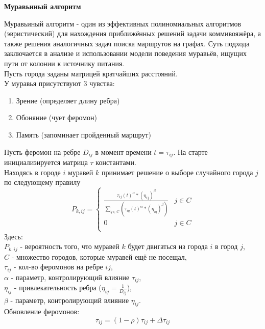 \documentclass[a4paper,12pt]{article}
\begin{document}
\begin{center}
\textbf{Муравьиный алгоритм}
\end{center}
Муравьиный алгоритм - один из эффективных полиномиальных алгоритмов (эвристический) для нахождения приближённых решений задачи коммивояжёра, а также решения аналогичных задач поиска маршрутов на графах. Суть подхода заключается в анализе и использовании модели поведения муравьёв, ищущих пути от колонии к источнику питания.\\
Пусть города заданы матрицей кратчайших расстояний.\\
У муравья присутствуют 3 чувства:
\begin{enumerate}
\item Зрение (определяет длину ребра)
\item Обоняние (чует феромон)
\item Память (запоминает пройденный маршрут)
\end{enumerate}
Пусть феромон на ребре $D_{ij}$ в момент времени $t = \tau_{ij}$. На старте инициализируется матрица $\tau$ константами.\\
Находясь в городе $i$ муравей $k$  принимает решение о выборе случайного города $j$ по следующему правилу\cite{Shtobva}\\
\begin{equation}\label{equations:equation1}
P_{k,ij} = \left\{
\begin{array}{ll}
\frac{\tau_{ij}(t)^\alpha * (\eta_{ij})^\beta}{\sum_{q \in C}(\tau_{iq}(t)^\alpha * (\eta_{iq})^\beta)} & j \in C \\
0 & j \in C \\
\end{array}
\right.
\end{equation}
Здесь:\\
$P_{k,ij}$ - вероятность того, что муравей $k$ будет двигаться из города $i$ в город $j$,\\
$C$ - множество городов, которые муравей ещё не посещал,\\
$\tau_{ij}$ - кол-во феромонов на ребре $ij$,\\
$\alpha$ - параметр, контролирующий влияние $\tau_{ij}$,\\
$\eta_{ij}$ - привлекательность ребра ($\eta_{ij} = \frac{1}{D_{ij}}$),\\
$\beta$ - параметр, контролирующий влияние $\eta_{ij}$.\\
Обновление феромонов:\\
\begin{equation}\label{equations:equation2}
\tau_{ij} = (1 - \rho)\tau_{ij} + \Delta\tau_{ij}
\end{equation}
\end{document}
